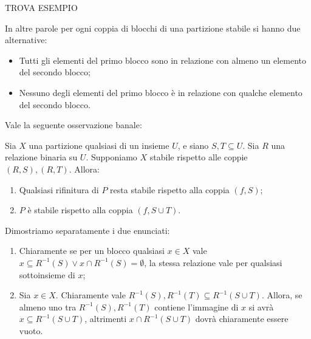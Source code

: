 \begin{example}
    \label{exa:set_partition_stable}
    TROVA ESEMPIO
\end{example}
In altre parole per ogni coppia di blocchi di una partizione stabile si hanno due alternative:
\begin{itemize}
    \item Tutti gli elementi del primo blocco sono in relazione con almeno un elemento del secondo blocco;
    \item Nessuno degli elementi del primo blocco è in relazione con qualche elemento del secondo blocco.
\end{itemize}
Vale la seguente osservazione banale:
\begin{observation}
    Sia $X$ una partizione qualsiasi di un insieme $U$, e siano $S,T \subseteq U$. Sia $R$ una relazione binaria su $U$. Supponiamo $X$ stabile rispetto alle coppie $(R,S),(R,T)$. Allora:
    \begin{enumerate}
        \item Qualsiasi rifinitura di $P$ resta stabile rispetto alla coppia $(f,S)$;
        \item $P$ è stabile rispetto alla coppia $(f,S \cup T)$.
    \end{enumerate}
\end{observation}
\begin{proof2}
    Dimostriamo separatamente i due enunciati:
    \begin{enumerate}
        \item Chiaramente se per un blocco qualsiasi $x \in X$ vale $x \subseteq R^{-1}(S) \lor x \cap R^{-1}(S) = \emptyset$, la stessa relazione vale per qualsiasi sottoinsieme di $x$;
        \item Sia $x \in X$. Chiaramente vale $R^{-1}(S),R^{-1}(T) \subseteq R^{-1}(S \cup T)$. Allora, se almeno uno tra $R^{-1}(S),R^{-1}(T)$ contiene l'immagine di $x$ si avrà $x \subseteq R^{-1}(S \cup T)$, altrimenti $x \cap R^{-1}(S \cup T)$ dovrà chiaramente essere vuoto.
    \end{enumerate}
    \vspace*{-0.75cm}
\end{proof2}

